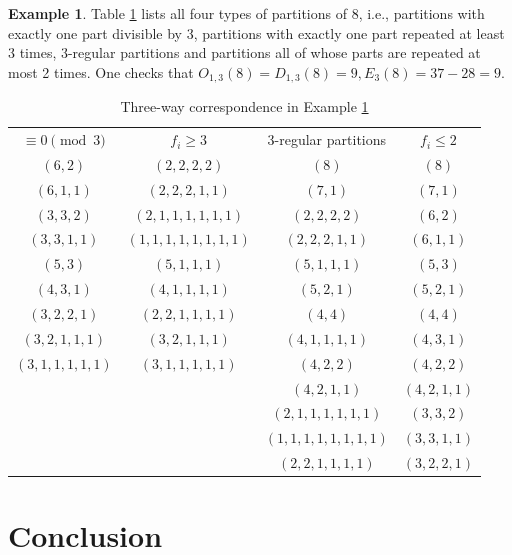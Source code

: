 \documentclass[12pt]{amsart}
\numberwithin{equation}{section}
\theoremstyle{plain}
\theoremstyle{definition}
\newtheorem{example}[theorem]{Example}
\begin{document}
\begin{example}\label{exam1}
Table \ref{Tab1} lists all four types of partitions of 8, i.e., partitions with exactly one part divisible by 3, partitions with exactly one part repeated at least 3 times, $3$-regular partitions and partitions all of whose parts are repeated at most 2 times. One checks that $O_{1,3}(8)=D_{1,3}(8)=9, E_{3}(8)=37-28=9$.
\end{example}
\begin{table}[tbp]\caption{Three-way correspondence in Example \ref{exam1}}\label{Tab1}
\centering
\begin{tabular}{c||c||cc}
$\equiv0\pmod{3}$ &$f_{i}\geq3$ &3-regular partitions &$f_{i}\leq2$\\
$(6,2)$ &$(2,2,2,2)$ &$(8)$ &$(8)$\\
$(6,1,1)$ &$(2,2,2,1,1)$ &$(7,1)$ &$(7,1)$\\
$(3,3,2)$ &$(2,1,1,1,1,1,1)$ &$(2,2,2,2)$ &$(6,2)$\\
$(3,3,1,1)$ &$(1,1,1,1,1,1,1,1)$ &$(2,2,2,1,1)$ &$(6,1,1)$\\
$(5,3)$ &$(5,1,1,1)$ &$(5,1,1,1)$ &$(5,3)$\\
$(4,3,1)$ &$(4,1,1,1,1)$ &$(5,2,1)$ &$(5,2,1)$\\
$(3,2,2,1)$ &$(2,2,1,1,1,1)$ &$(4,4)$ &$(4,4)$\\
$(3,2,1,1,1)$ &$(3,2,1,1,1)$ &$(4,1,1,1,1)$ &$(4,3,1)$\\
$(3,1,1,1,1,1)$ &$(3,1,1,1,1,1)$ &$(4,2,2)$ &$(4,2,2)$\\
 & &$(4,2,1,1)$ &$(4,2,1,1)$\\
 & &$(2,1,1,1,1,1,1)$ &$(3,3,2)$\\
 & &$(1,1,1,1,1,1,1,1)$ &$(3,3,1,1)$\\
 & &$(2,2,1,1,1,1)$ &$(3,2,2,1)$
\end{tabular}
\end{table}




\section{Conclusion}
\end{document}
